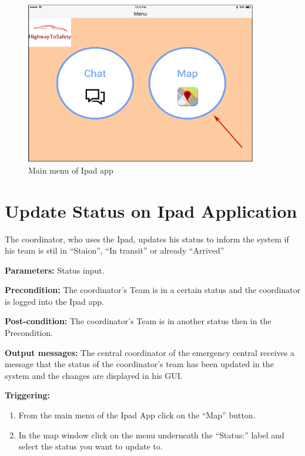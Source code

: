 \begin{minipage}{1.0\textwidth}
\begin{figure}[H]
\caption{Main menu of Ipad app}
\includegraphics[width=0.9\textwidth]{IpadAppHome.eps}
\end{figure}
\end{minipage}

\section{Update Status on Ipad Application}
\label{operation:MyOperation}
The coordinator, who uses the Ipad, updates his status to inform the system if
his team is stil in “Staion”, “In transit” or already “Arrived”

\begin{description}

\item \textbf{Parameters:} Status input.
\item \textbf{Precondition:} The coordinator's Team is in a certain status and
the coordinator is logged into the Ipad app.
\item \textbf{Post-condition:} The coordinator's Team is in another status then
in the Precondition.
\item \textbf{Output messages:} The central coordinator of the emergency central
receives a message that the status of the coordinator's team has been updated in
the system and the changes are displayed in his GUI.

\item \textbf{Triggering:} 
\begin{enumerate}
  \item From the main menu of the Ipad App click on the “Map” button.
  \item In the map window click on the menu underneath the “Status:” label and
  select the status you want to update to.
\end{enumerate}
\end{description}

